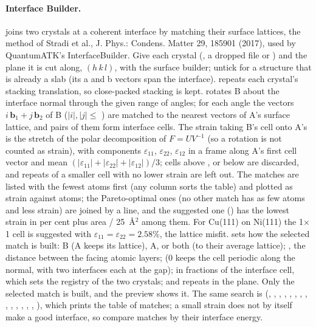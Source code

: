 \paragraph{Interface Builder.}  joins two crystals at a coherent interface by matching their surface lattices, the method of Stradi et al., J. Phys.: Condens. Matter 29, 185901 (2017), used by QuantumATK's InterfaceBuilder. Give each crystal (, a dropped file or ) and the plane it is cut along, $(h\,k\,l)$, with the surface builder; untick  for a structure that is already a slab (its a and b vectors span the interface).  repeats each crystal's stacking translation, so close-packed stacking is kept.  rotates B about the interface normal through the given range of angles; for each angle the vectors $i\,\mathbf b_1 + j\,\mathbf b_2$ of B ($|i|,|j| \le$ ) are matched to the nearest vectors of A's surface lattice, and pairs of them form interface cells. The strain taking B's cell onto A's is the stretch of the polar decomposition of $F = U V^{-1}$ (so a rotation is not counted as strain), with components $\varepsilon_{11}$, $\varepsilon_{22}$, $\varepsilon_{12}$ in a frame along A's first cell vector and mean $(|\varepsilon_{11}|+|\varepsilon_{22}|+|\varepsilon_{12}|)/3$; cells above ,  or below  are discarded, and repeats of a smaller cell with no lower strain are left out. The matches are listed with the fewest atoms first (any column sorts the table) and plotted as strain against atoms; the Pareto-optimal ones (no other match has as few atoms and less strain) are joined by a line, and the suggested one (\textbullet) has the lowest strain in per cent plus area / 25~\AA$^2$ among them. For Cu(111) on Ni(111) the 1$\times$1 cell is suggested with $\varepsilon_{11} = \varepsilon_{22} = 2.58\%$, the lattice misfit.  sets how the selected match is built:  B (A keeps its lattice), A, or both (to their average lattice); , the distance between the facing atomic layers;  (0 keeps the cell periodic along the normal, with two interfaces each at the gap);  in fractions of the interface cell, which sets the registry of the two crystals; and repeats in the plane. Only the selected match is built, and the preview shows it. The same search is  (, , , , , , , , , , , , , , ), which prints the table of matches; a small strain does not by itself make a good interface, so compare matches by their interface energy.


